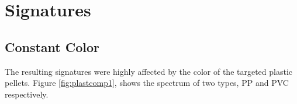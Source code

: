 \vspace{1.3cm}
\section{Signatures}

\subsection{Constant Color}
The resulting signatures were highly affected by the color of the targeted plastic pellets. Figure \ref{fig:plastcomp1}, shows the spectrum of two types, PP and PVC respectively. 

\begin{figure}[H]
  \newcommand*\FigVSkip{0.5em}
  \newcommand*\FigHSkip{0.1em}
  \newsavebox\FigBox
  \centering
  \begin{minipage}{\wd\FigBox}
    \centering\usebox{\FigBox}
  \end{minipage}

\end{figure}
